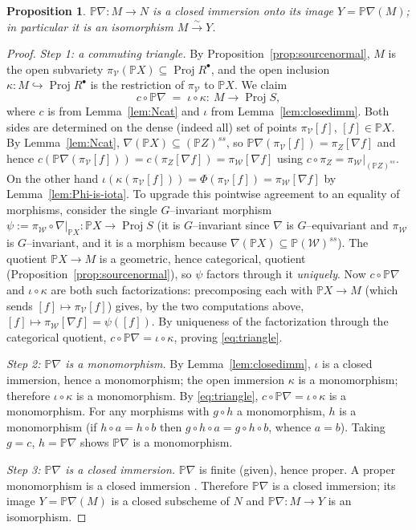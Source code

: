 \documentclass{amsart}
\newtheorem{proposition}{Proposition}
\theoremstyle{definition}
\DeclareMathOperator{\Proj}{Proj}
\newcommand{\PP}{\mathbb{P}}
\newcommand{\nab}{\nabla}
\begin{document}
\begin{proposition}\label{prop:iso-onto-image}
$\PP\nab\colon M\to N$ is a closed immersion onto its image $Y=\PP\nab(M)$; in particular it is
an isomorphism $M\xrightarrow{\sim} Y$.
\end{proposition}

\begin{proof}
\emph{Step 1: a commuting triangle.} By Proposition~\ref{prop:sourcenormal}, $M$ is the open
subvariety $\pi_{\mathcal V}(\PP X)\subseteq\Proj R^{\bullet}$, and the open inclusion
$\kappa\colon M\hookrightarrow\Proj R^{\bullet}$ is the restriction of $\pi_{\mathcal V}$ to
$\PP X$. We claim
\begin{equation}\label{eq:triangle}
c\circ \PP\nab \;=\; \iota\circ\kappa \colon\ M\longrightarrow \Proj S ,
\end{equation}
where $c$ is from Lemma~\ref{lem:Ncat} and $\iota$ from Lemma~\ref{lem:closedimm}. Both sides
are determined on the dense (indeed all) set of points $\pi_{\mathcal V}[f]$, $[f]\in\PP X$.
By Lemma~\ref{lem:Ncat}, $\nab(\PP X)\subseteq(\PP Z)^{ss}$, so $\PP\nab(\pi_{\mathcal V}[f])
=\pi_Z[\nab f]$ and hence $c(\PP\nab(\pi_{\mathcal V}[f]))=c(\pi_Z[\nab f])
=\pi_{\mathcal W}[\nab f]$ using $c\circ\pi_Z=\pi_{\mathcal W}|_{(\PP Z)^{ss}}$. On the other
hand $\iota(\kappa(\pi_{\mathcal V}[f]))=\Phi(\pi_{\mathcal V}[f])=\pi_{\mathcal W}[\nab f]$ by
Lemma~\ref{lem:Phi-is-iota}. To upgrade this pointwise agreement to an equality of morphisms,
consider the single $G$--invariant morphism
$\psi:=\pi_{\mathcal W}\circ\nab|_{\PP X}\colon\PP X\to\Proj S$ (it is $G$--invariant since
$\nab$ is $G$--equivariant and $\pi_{\mathcal W}$ is $G$--invariant, and it is a morphism
because $\nab(\PP X)\subseteq\PP(\mathcal W)^{ss}$). The quotient $\PP X\to M$ is a geometric,
hence categorical, quotient (Proposition~\ref{prop:sourcenormal}), so $\psi$ factors through it
\emph{uniquely}. Now $c\circ\PP\nab$ and $\iota\circ\kappa$ are both such factorizations:
precomposing each with $\PP X\to M$ (which sends $[f]\mapsto\pi_{\mathcal V}[f]$) gives, by the
two computations above, $[f]\mapsto\pi_{\mathcal W}[\nab f]=\psi([f])$. By uniqueness of the
factorization through the categorical quotient, $c\circ\PP\nab=\iota\circ\kappa$, proving
\eqref{eq:triangle}.

\emph{Step 2: $\PP\nab$ is a monomorphism.} By Lemma~\ref{lem:closedimm}, $\iota$ is a closed
immersion, hence a monomorphism; the open immersion $\kappa$ is a monomorphism; therefore
$\iota\circ\kappa$ is a monomorphism. By \eqref{eq:triangle},
$c\circ\PP\nab=\iota\circ\kappa$ is a monomorphism. For any morphisms with $g\circ h$ a
monomorphism, $h$ is a monomorphism (if $h\circ a=h\circ b$ then $g\circ h\circ a=g\circ h
\circ b$, whence $a=b$). Taking $g=c$, $h=\PP\nab$ shows $\PP\nab$ is a monomorphism.

\emph{Step 3: $\PP\nab$ is a closed immersion.} $\PP\nab$ is finite (given), hence proper. A
proper monomorphism is a closed immersion \cite[EGA IV, 18.12.6]{EGA4}. Therefore $\PP\nab$ is
a closed immersion; its image $Y=\PP\nab(M)$ is a closed subscheme of $N$ and
$\PP\nab\colon M\to Y$ is an isomorphism.
\end{proof}
\end{document}
